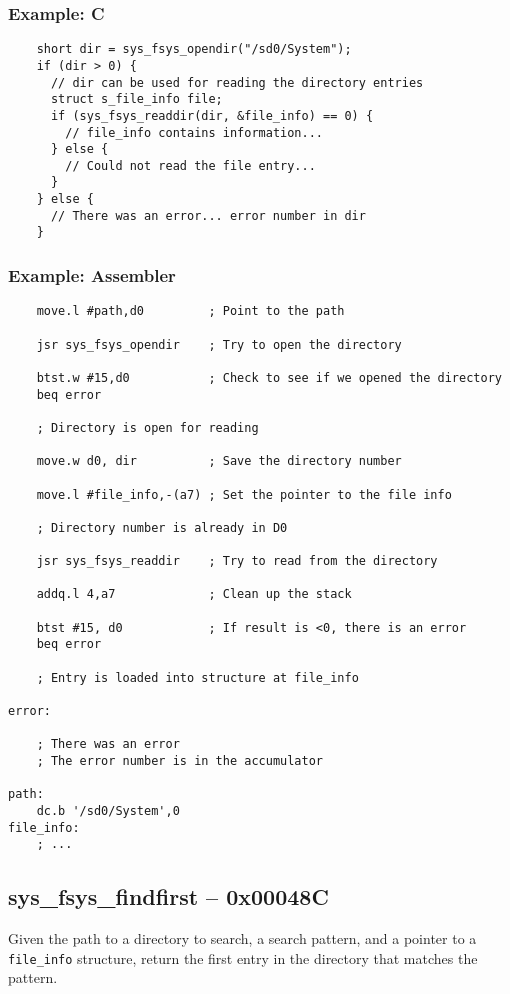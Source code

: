 \subsubsection*{Example: C}
\begin{lstlisting}
    short dir = sys_fsys_opendir("/sd0/System");
    if (dir > 0) {
      // dir can be used for reading the directory entries
      struct s_file_info file;
      if (sys_fsys_readdir(dir, &file_info) == 0) {
        // file_info contains information...
      } else {
        // Could not read the file entry...
      }
    } else {
      // There was an error... error number in dir
    }
\end{lstlisting}

\subsubsection*{Example: Assembler}
\begin{verbatim}
	move.l #path,d0         ; Point to the path

    jsr sys_fsys_opendir    ; Try to open the directory

    btst.w #15,d0           ; Check to see if we opened the directory
    beq error

    ; Directory is open for reading

	move.w d0, dir          ; Save the directory number

	move.l #file_info,-(a7) ; Set the pointer to the file info

    ; Directory number is already in D0

    jsr sys_fsys_readdir    ; Try to read from the directory

    addq.l 4,a7             ; Clean up the stack

    btst #15, d0            ; If result is <0, there is an error
    beq error

    ; Entry is loaded into structure at file_info

error:

    ; There was an error
    ; The error number is in the accumulator

path:
    dc.b '/sd0/System',0
file_info:
    ; ...
\end{verbatim}


\subsection*{sys\_fsys\_findfirst -- 0x00048C}
Given the path to a directory to search, a search pattern, and a pointer to a \verb+file_info+ structure,
return the first entry in the directory that matches the pattern.

